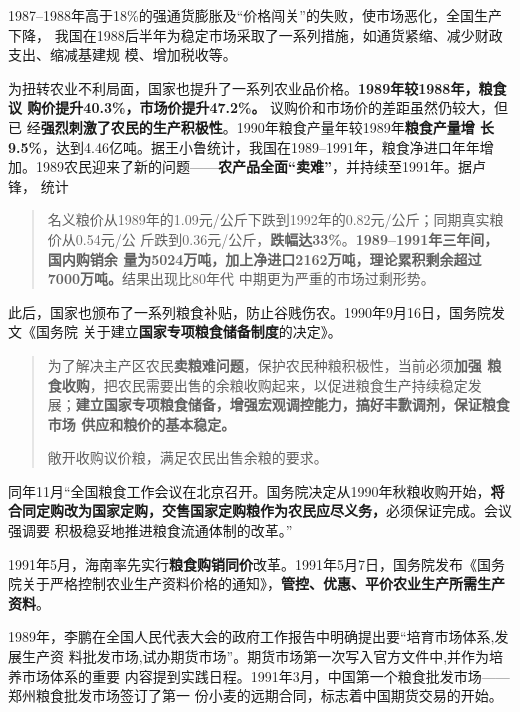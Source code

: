 1987--1988年高于18\%的强通货膨胀及“价格闯关”的失败，使市场恶化，全国生产下降，
我国在1988后半年为稳定市场采取了一系列措施，如通货紧缩、减少财政支出、缩减基建规
模、增加税收等。

为扭转农业不利局面，国家也提升了一系列农业品价格。\textbf{1989年较1988年，粮食议
  购价提升40.3\%，市场价提升47.2\%。} 议购价和市场价的差距虽然仍较大，但已
经\textbf{强烈刺激了农民的生产积极性}。1990年粮食产量年较1989年\textbf{粮食产量增
  长9.5\%}，达到4.46亿吨。据王小鲁统计，我国在1989--1991年，粮食净进口年年增
加。1989农民迎来了新的问题——\textbf{农产品全面“卖难”}，并持续至1991年。据卢锋，
统计
\begin{quotation}
  名义粮价从1989年的1.09元/公斤下跌到1992年的0.82元/公斤；同期真实粮价从0.54元/公
  斤跌到0.36元/公斤，\textbf{跌幅达33\%}。\textbf{1989--1991年三年间，国内购销余
    量为5024万吨，加上净进口2162万吨，理论累积剩余超过7000万吨。}结果出现比80年代
  中期更为严重的市场过剩形势。
\end{quotation}

此后，国家也颁布了一系列粮食补贴，防止谷贱伤农。1990年9月16日，国务院发文《国务院
关于建立\textbf{国家专项粮食储备制度}的决定》。
\begin{quotation}
  为了解决主产区农民\textbf{卖粮难问题}，保护农民种粮积极性，当前必须\textbf{加强
    粮食收购}，把农民需要出售的余粮收购起来，以促进粮食生产持续稳定发
  展；\textbf{建立国家专项粮食储备，增强宏观调控能力，搞好丰歉调剂，保证粮食市场
  供应和粮价的基本稳定。}

敞开收购议价粮，满足农民出售余粮的要求。
\end{quotation}

同年11月“全国粮食工作会议在北京召开。国务院决定从1990年秋粮收购开始，\textbf{将
  合同定购改为国家定购，交售国家定购粮作为农民应尽义务，}必须保证完成。会议强调要
积极稳妥地推进粮食流通体制的改革。”

1991年5月，海南率先实行\textbf{粮食购销同价}改革。1991年5月7日，国务院发布《国务
院关于严格控制农业生产资料价格的通知》，\textbf{管控、优惠、平价农业生产所需生产
  资料}。

1989年，李鹏在全国人民代表大会的政府工作报告中明确提出要“培育市场体系,发展生产资
料批发市场,试办期货市场”。期货市场第一次写入官方文件中,并作为培养市场体系的重要
内容提到实践日程。1991年3月，中国第一个粮食批发市场——郑州粮食批发市场签订了第一
份小麦的远期合同，标志着中国期货交易的开始。\cite{taochangsheng}




